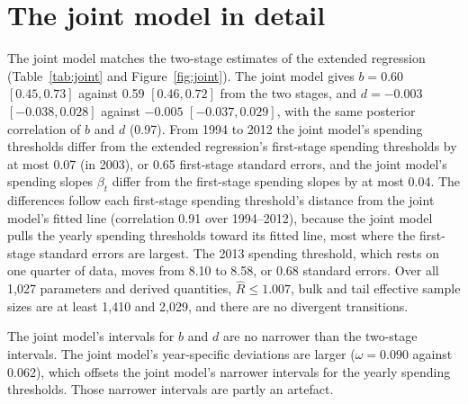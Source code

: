 \documentclass[11pt]{article}
\begin{document}
\begin{table}[!htbp]
\centering
\caption{The switch test, CPS (October 1984 to October 2003) and CE (1994--2013): posterior medians with 90\% intervals. $d_1$ and $d_2$ are the unexplained trends before and after the switch date (yearly changes in the log spending threshold), and $o$ is the CPS offset. $\Delta\widehat{\text{elpd}}$ is the difference in expected log predictive density from the best model in its panel, with its standard error (leave-one-out, with exact refits for Pareto $k > 0.7$).}
\label{tab:switch}
\resizebox{\textwidth}{!}{}
\end{table}

\section{The joint model in detail}
\label{sec:joint}

The joint model matches the two-stage estimates of the extended regression (Table~\ref{tab:joint} and Figure~\ref{fig:joint}). The joint model gives $b = 0.60$ $[0.45, 0.73]$ against 0.59 $[0.46, 0.72]$ from the two stages, and $d = -0.003$ $[-0.038, 0.028]$ against $-0.005$ $[-0.037, 0.029]$, with the same posterior correlation of $b$ and $d$ (0.97). From 1994 to 2012 the joint model's spending thresholds differ from the extended regression's first-stage spending thresholds by at most 0.07 (in 2003), or 0.65 first-stage standard errors, and the joint model's spending slopes $\beta_t$ differ from the first-stage spending slopes by at most 0.04. The differences follow each first-stage spending threshold's distance from the joint model's fitted line (correlation 0.91 over 1994--2012), because the joint model pulls the yearly spending thresholds toward its fitted line, most where the first-stage standard errors are largest. The 2013 spending threshold, which rests on one quarter of data, moves from 8.10 to 8.58, or 0.68 standard errors. Over all 1{,}027 parameters and derived quantities, $\hat R \le 1.007$, bulk and tail effective sample sizes are at least 1{,}410 and 2{,}029, and there are no divergent transitions.

The joint model's intervals for $b$ and $d$ are no narrower than the two-stage intervals. The joint model's year-specific deviations are larger ($\omega = 0.090$ against 0.062), which offsets the joint model's narrower intervals for the yearly spending thresholds. Those narrower intervals are partly an artefact.
\end{document}
